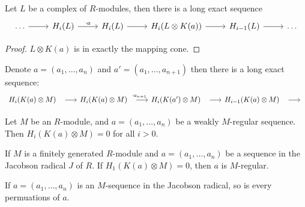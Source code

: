\begin{lemma}
	\label{lem:koszul_induces_long_exact_seq}
	Let $L$ be a complex of $R$-modules, then there is a long exact sequence
\[\begin{tikzcd}
	\dots & {H_i(L)} & {H_i(L)} & {H_i(L\otimes K(a))} & {H_{i-1}(L)} & \dots
	\arrow[from=1-1, to=1-2]
	\arrow["{\cdot a}", from=1-2, to=1-3]
	\arrow[from=1-3, to=1-4]
	\arrow[from=1-4, to=1-5]
	\arrow[from=1-5, to=1-6]
\end{tikzcd}\]

\begin{proof}
	$L \otimes K(a)$ is in exactly the mapping cone.
\end{proof}

\end{lemma}


\begin{corollary}
	\label{cor:tensor_koszul_induced_long_exact_seq}
	Denote $a = (a_1, \dots, a_n)$ and $a' = (a_1, \dots, a_{n+1})$ then there is a long exact sequence:
\[\begin{tikzcd}
	{H_i(K(a) \otimes M)} & {H_i(K(a) \otimes M)} & {H_i(K(a') \otimes M)} & {H_{i-1}(K(a) \otimes M)} & 
	\arrow[shorten <=8pt, from=1-1, to=1-2]
	\arrow[shorten <=8pt, "{\cdot a_{n+1}}", from=1-2, to=1-3]
	\arrow[shorten <=8pt, from=1-3, to=1-4]
	\arrow[shorten <=8pt, from=1-4, to=1-5]
\end{tikzcd}\]
\end{corollary}

\begin{theorem}
	\label{thm:reg_seq_implies_koszul_exact}
	Let $M$ be an $R$-module, and $a = (a_1, \dots, a_n)$ be a weakly $M$-regular sequence.
	Then $H_i(K(a) \otimes M) = 0$ for all $i > 0$.
\end{theorem}

\begin{lemma}
	\label{lem:reg_in_jrad_iff_koszul_exact_at_one}
	If $M$ is a finitely generated $R$-module and $a = (a_1, \dots, a_n)$ be a sequence in the Jacobson radical $J$ of $R$.
	If $H_1(K(a) \otimes M) = 0$, then $a$ is $M$-regular.
\end{lemma}

\begin{corollary}
	\label{cor:perm_of_reg_seq_in_jrad_is_reg}
	If $a = (a_1, \dots, a_n)$ is an $M$-sequence in the Jacobson radical, so is every permuations of $a$.
\end{corollary}

